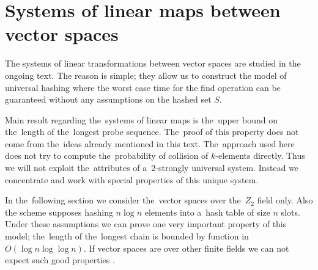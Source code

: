 \chapter{Systems of linear maps between vector spaces}
The systems of linear transformations between vector spaces are studied in the ongoing text. The reason is simple; they allow us to construct the model of universal hashing where the worst case time for the find operation can be guaranteed without any assumptions on the hashed set $S$. 

Main result regarding the~systems of linear maps is the~upper bound on the~length of the~longest probe sequence. The~proof of this property does not come from the~ideas already mentioned in this text. The~approach used here does not try to compute the~probability of collision of $k$-elements directly. Thus we will not exploit the~attributes of a~$2$-strongly universal system. Instead we concentrate and work with special properties of this unique system.

In the~following section we consider the~vector spaces over the~$Z_2$ field only. Also the scheme supposes hashing $n \log n$ elements into a~hash table of size $n$ slots. Under these assumptions we can prove one very important property of this model; the~length of the~longest chain is bounded by function in $O(\log n \log \log n)$. If vector spaces are over other finite fields we can not expect such good properties \cite{DBLP:journals/jacm/AlonDMPT99}.

